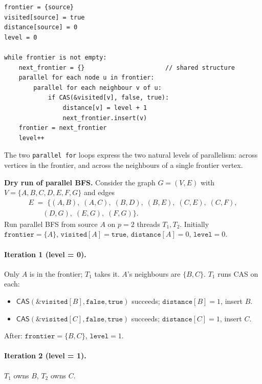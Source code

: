 \begin{verbatim}
frontier = {source}
visited[source] = true
distance[source] = 0
level = 0

while frontier is not empty:
    next_frontier = {}                      // shared structure
    parallel for each node u in frontier:
        parallel for each neighbour v of u:
            if CAS(&visited[v], false, true):
                distance[v] = level + 1
                next_frontier.insert(v)
    frontier = next_frontier
    level++
\end{verbatim}

The two \texttt{parallel for} loops express the two natural levels of
parallelism: across vertices in the frontier, and across the neighbours
of a single frontier vertex.

\begin{ppexample}
\textbf{Dry run of parallel BFS.}
Consider the graph $G = (V, E)$ with $V = \{A, B, C, D, E, F, G\}$
and edges
\[
\begin{aligned}
E \;=\; \{(A,B),\; (A,C),\; (B,D),\; (B,E),\; (C,E),\; (C,F),\\
\qquad (D,G),\; (E,G),\; (F,G)\}.
\end{aligned}
\]
Run parallel BFS from source $A$ on $p = 2$ threads $T_1, T_2$.
Initially $\texttt{frontier} = \{A\}$, $\texttt{visited}[A] =
\texttt{true}$, $\texttt{distance}[A] = 0$, $\texttt{level} = 0$.

\paragraph{Iteration 1 (level = 0).}
Only $A$ is in the frontier; $T_1$ takes it.  $A$'s neighbours are
$\{B, C\}$.  $T_1$ runs CAS on each:
\begin{itemize}
  \item $\textsf{CAS}(\&\texttt{visited}[B], \texttt{false}, \texttt{true})$
        succeeds; $\texttt{distance}[B] = 1$, insert $B$.
  \item $\textsf{CAS}(\&\texttt{visited}[C], \texttt{false}, \texttt{true})$
        succeeds; $\texttt{distance}[C] = 1$, insert $C$.
\end{itemize}
After: $\texttt{frontier} = \{B, C\}$, $\texttt{level} = 1$.

\paragraph{Iteration 2 (level = 1).}
$T_1$ owns $B$, $T_2$ owns $C$.


\end{ppexample}
